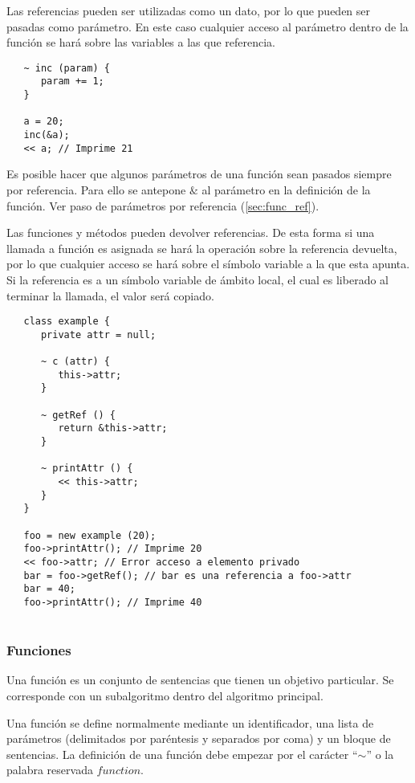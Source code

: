 Las referencias pueden ser utilizadas como un dato, por lo que pueden ser pasadas como parámetro. En este caso cualquier acceso al parámetro dentro de la función 
se hará sobre las variables a las que referencia. \\

\begin{lstlisting}
   ~ inc (param) {
      param += 1;
   }
   
   a = 20;
   inc(&a);
   << a; // Imprime 21
\end{lstlisting}

Es posible hacer que algunos parámetros de una función sean pasados siempre por referencia. Para ello se antepone $\&$ al parámetro en la definición de
la función. Ver paso de parámetros por referencia (\autoref{sec:func_ref}).

Las funciones y métodos pueden devolver referencias. De esta forma si una llamada a función es asignada se hará la operación sobre la referencia devuelta, 
por lo que cualquier acceso se hará sobre el símbolo variable a la que esta apunta. Si la referencia es a un símbolo variable de ámbito local, el cual es liberado al terminar la llamada, 
el valor será copiado. \\

\begin{lstlisting}
   class example {
      private attr = null;
      
      ~ c (attr) {
         this->attr;
      }
      
      ~ getRef () {
         return &this->attr;
      }
      
      ~ printAttr () {
         << this->attr;
      }
   }
   
   foo = new example (20);
   foo->printAttr(); // Imprime 20
   << foo->attr; // Error acceso a elemento privado
   bar = foo->getRef(); // bar es una referencia a foo->attr
   bar = 40; 
   foo->printAttr(); // Imprime 40
   
\end{lstlisting}

\subsubsection{Funciones} \label{sec:function}
Una función es un conjunto de sentencias que tienen un objetivo particular. Se corresponde con un
subalgoritmo dentro del algoritmo principal.

Una función se define normalmente mediante un identificador, una lista de parámetros (delimitados por paréntesis y separados por coma) y un bloque de sentencias. La
definición de una función debe empezar por el carácter ``$\sim$'' o la palabra reservada $function$. \\

